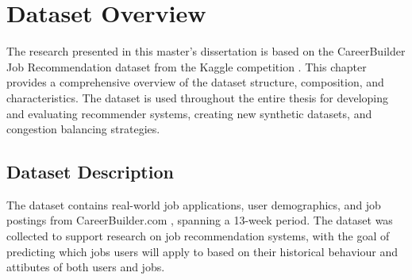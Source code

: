 \chapter{Dataset Overview}
\label{chap:dataset_overview}

The research presented in this master's dissertation is based on the CareerBuilder Job Recommendation dataset from the Kaggle competition \cite{careerbuilderdataset}. This chapter provides a comprehensive overview of the dataset structure, composition, and characteristics. The dataset is used throughout the entire thesis for developing and evaluating recommender systems, creating new synthetic datasets, and congestion balancing strategies.

\section{Dataset Description}
\label{sec:dataset_description}

The dataset contains real-world job applications, user demographics, and job postings from CareerBuilder.com \cite{careerbuilderwebsite}, spanning a 13-week period. The dataset was collected to support research on job recommendation systems, with the goal of predicting which jobs users will apply to based on their historical behaviour and attibutes of both users and jobs. 
